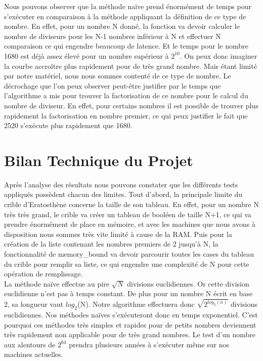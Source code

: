 Nous pouvons observer que la méthode naïve prend énormément de temps pour s'exécuter en comparaison à la méthode appliquant la définition de ce type de nombre. En effet, pour un nombre N donné, la fonction va devoir calculer le nombre de diviseurs pour les N-1 nombres inférieur à N et effectuer N comparaison ce qui engendre beaucoup de latence. Et le temps pour le nombre 1680 est déjà assez élevé  pour un nombre supérieur à $2^{10}$. On peux donc imaginer la courbe accroître plus rapidement pour de très grand nombre. Mais étant limité par notre matériel, nous nous sommes contenté de ce type de nombre. Le décrochage que l'on peux observer peut-être justifier par le temps que l'algorithme a mis pour trouver la factorisation de ce nombre pour le calcul du nombre de diviseur. En effet, pour certains nombres il est possible de trouver plus rapidement la factorisation en nombre premier, ce qui peux justifier le fait que 2520 s'exécute plus rapidement que 1680.
	
	\section{Bilan Technique du Projet}	
		Après l'analyse des résultats nous pouvons constater que les différents tests appliqués possèdent chacun des limites.	
		Tout d'abord, la principale limite du crible d'Eratosthène concerne la taille de son tableau. En effet, pour un nombre N très très grand, le crible va créer un tableau de booléen de taille N+1, ce qui va prendre énormément de place en mémoire, et avec les machines que nous avons à disposition nous sommes très vite limité à cause de la RAM. Puis pour la création de la liste contenant les nombres premiers de 2 jusqu'à N, la fonctionnalité de memory\_bound va devoir parcourir toutes les cases du tableau du crible pour remplir sa liste, ce qui engendre une complexité de N pour cette opération de remplissage.\\
		
		La méthode naïve effectue au pire $\sqrt{N}$ divisions euclidiennes. Or cette division euclidienne n'est pas à temps constant. De plus pour un nombre N écrit en base 2, sa longueur vaut $log_2$(N). Notre algorithme effectuera donc $\sqrt{2^{log_2(n)}}$ divisions euclidiennes. Nos méthodes naïves s’exécuteront donc en temps exponentiel. C'est pourquoi ces méthodes très simples et rapides pour de petits nombres deviennent très rapidement non applicable pour de très grand nombres. Le test d'un nombre aux alentours de $2^{64}$ prendra plusieurs années à s’exécuter même sur nos machines actuelles.\\
		
